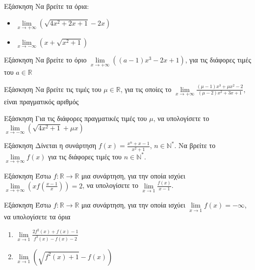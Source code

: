 \documentclass[greek]{beamer}
\begin{document}
\begin{frame}{Εξάσκηση}
 Να βρείτε τα όρια:
 \begin{itemize}
  \item $\lim\limits_{x \to +\infty}{ \left( \sqrt{4x^2+2x+1}-2x \right)  }$ \pause
  \item $\lim\limits_{x \to -\infty}{ \left( x+ \sqrt{x^2+1} \right)  }$
 \end{itemize}
\end{frame}

\begin{frame}{Εξάσκηση}
 Να βρείτε το όριο $\lim\limits_{x \to +\infty}{ \left( (a-1)x^3-2x+1 \right)  }$, για τις διάφορες τιμές του $a\in\mathbb{R}$
\end{frame}

\begin{frame}{Εξάσκηση}
 Να βρείτε τις τιμές του $μ\in\mathbb{R}$, για τις οποίες το $\lim\limits_{x \to +\infty}{ \frac{(μ-1)x^3+μx^2-2}{(μ-2)x^2+3x+1}  }$, είναι πραγματικός αριθμός
\end{frame}

\begin{frame}{Εξάσκηση}
 Για τις διάφορες πραγματικές τιμές του $μ$, να υπολογίσετε το $\lim\limits_{x \to -\infty}{ \left( \sqrt{4x^2+1}+μx \right)  }$
\end{frame}

\begin{frame}{Εξάσκηση}
 Δίνεται η συνάρτηση $f(x)=\frac{x^n+x-1}{x^2+1}$, $n\in\mathbb{N}^*$. Να βρείτε το $\lim\limits_{x \to +\infty}{ f(x) } $ για τις διάφορες τιμές του $n\in\mathbb{N}^*$.
\end{frame}

\begin{frame}{Εξάσκηση}
 Έστω $f:\mathbb{R}\to\mathbb{R}$ μια συνάρτηση, για την οποία ισχύει $\lim\limits_{x \to +\infty}{ \left( xf\left( \frac{x-1}{x} \right)  \right)  }=2$, να υπολογίσετε το $\lim\limits_{x \to 1}{ \frac{f(x)}{x-1} }$.
\end{frame}

\begin{frame}{Εξάσκηση}
 Έστω $f:\mathbb{R}\to\mathbb{R}$ μια συνάρτηση, για την οποία ισχύει $\lim\limits_{x \to 1}{ f(x)  }=-\infty$, να υπολογίσετε τα όρια
 \begin{enumerate}
  \item $\lim\limits_{x \to 1}{ \frac{2f^2(x)+f(x)-1}{f^3(x)-f(x)-2} }$ \pause
  \item $\lim\limits_{x \to 1}{ \left( \sqrt{f^2(x)+1}-f(x) \right)  }$
 \end{enumerate}
\end{frame}
\end{document}
